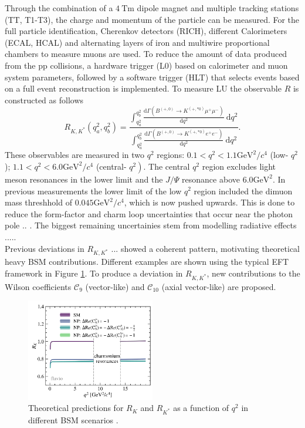 \documentclass[%
 reprint,
 amsmath,amssymb,
 aps,
]{revtex4-2}
\begin{document}
Through the combination of a $\SI{4}{\tesla\meter}$ dipole magnet and multiple tracking stations (TT, T1-T3), the charge and momentum of the particle can be measured.
For the full particle identification, Cherenkov detectors (RICH), different Calorimeters (ECAL, HCAL) and alternating layers of iron and multiwire proportional chambers to measure muons are used.
To reduce the amount of data produced from the pp collisions, a hardware trigger (L0) based on calorimeter and muon system parameters, followed by a software trigger (HLT) that selects events based on a full event reconstruction is implemented.
\newline
To measure LU the observable $R$ is constructed as follows
\begin{equation}
    \label{eqn:1}
    R_{K, K^*}\left(q_a^2, q_b^2\right)=\frac{\int_{q_a^2}^{q_b^2} \frac{\mathrm{d} \Gamma\left(B^{(+, 0)} \rightarrow K^{(+, * 0)} \mu^{+} \mu^{-}\right)}{\mathrm{d} q^2} \mathrm{~d} q^2}{\int_{q_a^2}^{q_b^2} \frac{\mathrm{d} \Gamma\left(B^{(+, 0)} \rightarrow K^{(+, * 0)} e^{+} e^{-}\right)}{\mathrm{d} q^2} \mathrm{~d} q^2}.
\end{equation}
These observables are measured in two $q^2$ regions: $0.1<q^2<1.1 \mathrm{GeV}^2 / c^4$ (low- $q^2$); $1.1<q^2<6.0 \mathrm{GeV}^2 / c^4$ (central- $\left.q^2\right)$. 
The central $q^2$ region excludes light meson resonances in the lower limit and the $J/\Psi$ resonance above $6.0 \mathrm{GeV}^2$. In previous measurements the lower limit of the low $q^2$ region 
included the dimuon mass threshhold of $0.045 \mathrm{GeV}^2 / c^4$, which is now pushed upwards.
This is done to reduce the form-factor and charm loop uncertainties 
that occur near the photon pole .. .
The biggest remaining uncertainies stem from modelling radiative effects .....
\\
Previous deviations in $R_{K, K^*}$ ... showed a coherent pattern, motivating theoretical heavy BSM contributions. Different examples are shown using the typical EFT framework in Figure \ref{fig:1}.
To produce a deviation in $R_{K, K^*}$, new contributions to the Wilson coefficients $\mathcal{C}_9$ (vector-like) and $\mathcal{C}_{10}$ (axial vector-like) are proposed.
\begin{figure}
    \centering
    \includegraphics[width=0.5\textwidth]{theory2.png}
    \caption{Theoretical predictions for $R_K$ and $R_{K^*}$ as a function of $q^2$ in different BSM scenarios \cite{lhcbcollaboration2022measurement}.}
    \label{fig:1}
\end{figure}
\end{document}
